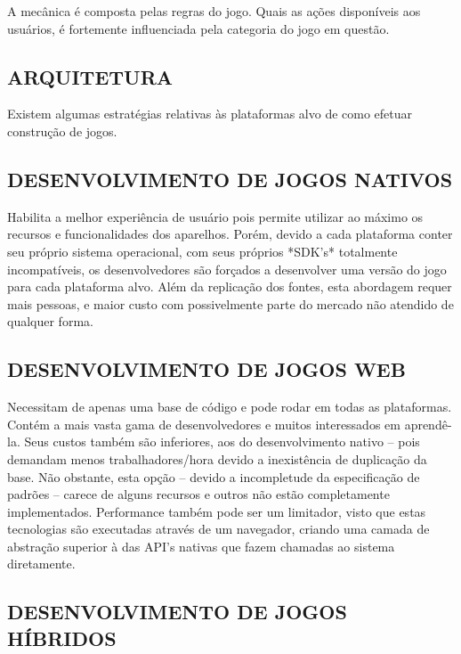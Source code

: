 \documentclass[11pt,a4paper]{article}
\begin{document}
A mecânica é composta pelas regras do jogo. Quais as ações
disponíveis aos usuários, é fortemente influenciada pela categoria do
jogo em questão.

\subsection{ARQUITETURA}

Existem algumas estratégias relativas às plataformas alvo de como
efetuar construção de jogos.

\subsection{DESENVOLVIMENTO DE JOGOS NATIVOS}

Habilita a melhor experiência de usuário pois permite utilizar ao
máximo os recursos e funcionalidades dos aparelhos. Porém, devido
a cada plataforma conter seu próprio sistema operacional, com seus
próprios *SDK's* totalmente incompatíveis, os desenvolvedores são
forçados a desenvolver uma versão do jogo para cada plataforma alvo.
Além da replicação dos fontes, esta abordagem requer mais pessoas, e
maior custo com possivelmente parte do mercado não atendido de qualquer
forma.

\subsection{DESENVOLVIMENTO DE JOGOS WEB}

Necessitam de apenas uma base de código e pode rodar em todas as      
plataformas. Contém a mais vasta gama de desenvolvedores e muitos      
interessados em aprendê-la. Seus custos também são inferiores, aos  
do desenvolvimento nativo – pois demandam menos trabalhadores/hora   
devido a inexistência de duplicação da base. Não obstante, esta     
opção – devido a incompletude da especificação de padrões       
– carece de alguns recursos e outros não estão completamente       
implementados. Performance também pode ser um limitador, visto que    
estas tecnologias são executadas através de um navegador, criando uma
camada de abstração superior à das API's nativas que fazem chamadas 
ao sistema diretamente.                                                 

\subsection{DESENVOLVIMENTO DE JOGOS HÍBRIDOS}
\end{document}
